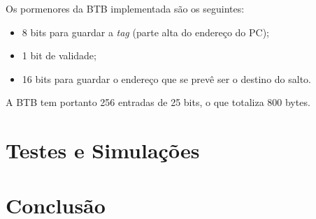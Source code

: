 \documentclass[a4paper]{article}
\begin{document}
	Os pormenores da BTB implementada são os seguintes:
	
	\begin{itemize}
		\item 8 bits para guardar a \textit{tag} (parte alta do endereço do PC);
		\item 1 bit de validade;
		\item 16 bits para guardar o endereço que se prevê ser o destino do salto.
	\end{itemize}
	
	A BTB tem portanto 256 entradas de 25 bits, o que totaliza 800 bytes.
	
	\section{Testes e Simulações}
		
	\section{Conclusão}
\end{document}
